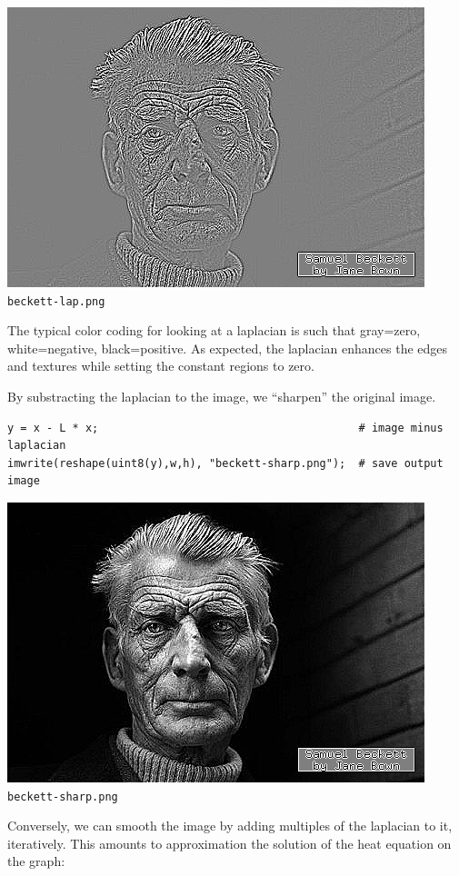 \includegraphics{beckett-lap.png}
\verb+beckett-lap.png+

The typical color coding for looking at a laplacian is such that gray=zero,
white=negative, black=positive.  As expected, the laplacian enhances the
edges and textures while setting the constant regions to zero.

By substracting the laplacian to the image, we ``sharpen'' the original image.

\begin{verbatim}
y = x - L * x;                                        # image minus laplacian
imwrite(reshape(uint8(y),w,h), "beckett-sharp.png");  # save output image
\end{verbatim}

\includegraphics{beckett-sharp.png}
\verb+beckett-sharp.png+

Conversely, we can smooth the image by adding multiples of the laplacian to
it, iteratively.  This amounts to approximation the solution of the heat
equation on the graph:

